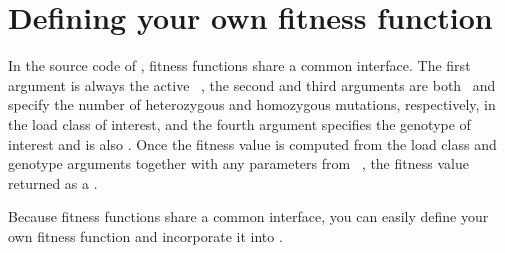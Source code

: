 \section{Defining your own fitness function}

In the source code of \K, fitness functions share a common interface.  The first argument is always the active \KConfig\ \KK, the second and third arguments are both \KInt\ and specify the number of heterozygous and homozygous mutations, respectively, in the load class of interest, and the fourth argument specifies the genotype of interest and is also \KInt.  Once the fitness value is computed from the load class and genotype arguments together with any parameters from \KConfig\ \KK, the fitness value returned as a \KScalar.

Because fitness functions share a common interface, you can easily define your own fitness function and incorporate it into \K.

